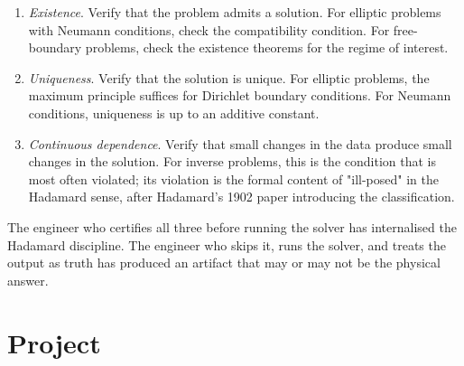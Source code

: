 \begin{enumerate}[leftmargin=*]
  \item \emph{Existence}. Verify that the problem admits a
    solution. For elliptic problems with Neumann conditions, check
    the compatibility condition. For free-boundary problems,
    check the existence theorems for the regime of interest.
  \item \emph{Uniqueness}. Verify that the solution is unique.
    For elliptic problems, the maximum principle suffices for
    Dirichlet boundary conditions. For Neumann conditions,
    uniqueness is up to an additive constant.
  \item \emph{Continuous dependence}. Verify that small changes
    in the data produce small changes in the solution. For inverse
    problems, this is the condition that is most often violated;
    its violation is the formal content of "ill-posed" in the
    Hadamard sense, after Hadamard's 1902 paper introducing the
    classification.
\end{enumerate}

The engineer who certifies all three before running the solver
has internalised the Hadamard discipline. The engineer who skips
it, runs the solver, and treats the output as truth has produced
an artifact that may or may not be the physical answer.

\section{Project}

